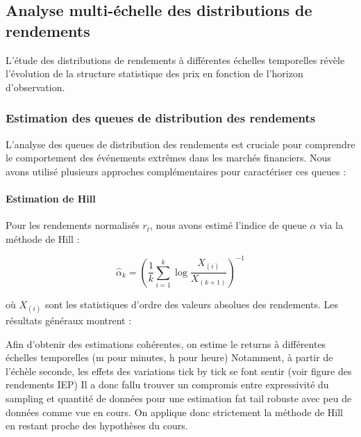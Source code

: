 \documentclass[10pt,a4paper]{article}
\theoremstyle{definition}
\theoremstyle{remark}
\begin{document}
\subsection{Analyse multi-échelle des distributions de rendements}

L'étude des distributions de rendements à différentes échelles temporelles révèle l'évolution de la structure statistique des prix en fonction de l'horizon d'observation.

\subsubsection{Estimation des queues de distribution des rendements}

L'analyse des queues de distribution des rendements est cruciale pour comprendre le comportement des événements extrêmes dans les marchés financiers. Nous avons utilisé plusieurs approches complémentaires pour caractériser ces queues :

\paragraph{Estimation de Hill}
Pour les rendements normalisés $r_t$, nous avons estimé l'indice de queue $\alpha$ via la méthode de Hill :

\begin{equation}
\hat{\alpha}_k = \left(\frac{1}{k} \sum_{i=1}^k \log \frac{X_{(i)}}{X_{(k+1)}}\right)^{-1}
\end{equation}

où $X_{(i)}$ sont les statistiques d'ordre des valeurs absolues des rendements. Les résultats généraux montrent :

Afin d'obtenir des estimations cohérentes, on estime le returns à différentes échelles temporelles (m pour minutes, h pour heure)
Notamment, à partir de l'échèle seconde, les effets des variations tick by tick se font sentir (voir figure des rendements IEP)
Il a donc fallu trouver un compromis entre expressivité du sampling et quantité de données pour une estimation fat tail robuste avec peu de données comme vue en cours.
On applique donc strictement la méthode de Hill en restant proche des hypothèses du cours.
\end{document}
